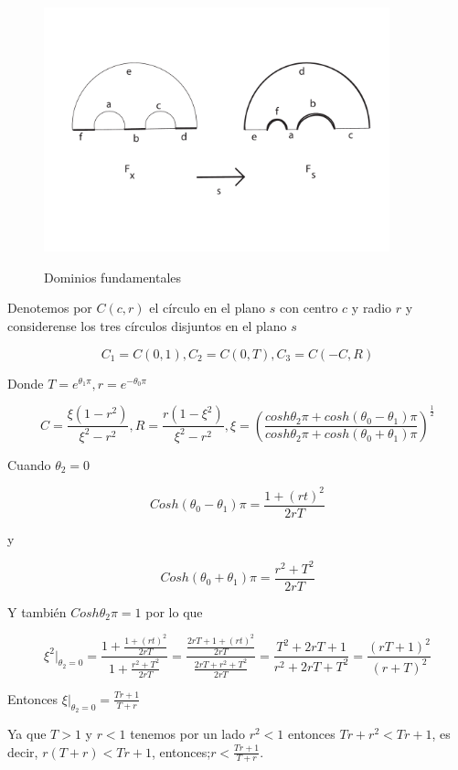 \begin{figure}[h]
  \centering
  \includegraphics[width=10cm]{dominiosfundamentales.pdf}\\
  \caption{Dominios fundamentales}\label{dominiosfundamentales}
\end{figure}



Denotemos por $C(c,r)$ el c\'irculo en el plano $s$ con centro $c$ y radio $r$ y considerense los tres c\'irculos disjuntos en el plano $s$

$$ C_{1} = C(0,1), C_{2}=C(0,T), C_{3}= C(-C,R)$$

Donde $T=e^{\theta_{1} \pi}, r= e^{-\theta_{0} \pi}$

$$ C=\frac{\xi (1-r^{2})}{\xi^{2}-r^{2}},R=\frac{r(1-\xi^{2})}{\xi^{2}-r^{2}}, \xi =( \frac{cosh \theta_{2} \pi + cosh(\theta_{0}-\theta_{1}) \pi}{cosh \theta_{2} \pi + cosh(\theta_{0} + \theta_{1})\pi} )^{\frac{1}{2}}$$


Cuando $\theta_{2} = 0$

$$ Cosh (\theta_{0}-\theta_{1})\pi = \frac{1+(rt)^{2}}{2rT}$$

y

$$Cosh( \theta_{0} + \theta_{1})\pi = \frac{r^{2} + T^{2}}{2rT}$$

 Y tambi\'en $Cosh\theta_{2}\pi = 1 $ por lo que

 $$\xi^{2}|_{\theta_{2}=0} = \frac{1 + \frac{1 + (rt)^{2}}{2rT}}{ 1 + \frac{r^{2 } + T^{2}}{2rT}} = \frac{\frac{2rT + 1 + (rt)^{2}}{2rT}}{\frac{2rT + r^{2} + T^{2}}{2rT}}= \frac{T^{2} + 2rT +1}{r^{2} + 2rT + T^{2}} = \frac{(rT  + 1)^{2}}{(r + T)^{2}}$$

Entonces $\xi|_{\theta_{2}=0} = \frac{Tr + 1}{ T +r}$

Ya que $T>1$ y $r <1$ tenemos por un lado $r^{2}<1$ entonces $Tr + r^{2} < Tr + 1$, es decir, $r(T+r)< Tr +1$, entonces;$r<\frac{Tr + 1}{T+r}$.

